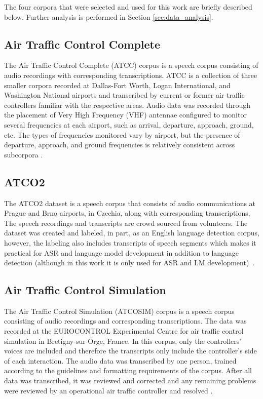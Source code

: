 \documentclass[12pt]{article}
\begin{document}
The four corpora that were selected and used for this work are briefly described below. Further analysis is performed in Section
\ref{sec:data_analysis}.

\subsection{Air Traffic Control Complete}\label{sec:atcc}
The Air Traffic Control Complete (ATCC) corpus is a speech corpus consisting of audio recordings with corresponding transcriptions.
ATCC is a collection of three smaller corpora recorded at Dallas-Fort Worth, Logan International, and Washington National airports and
transcribed by current or former air traffic controllers familiar with the respective areas. Audio data was recorded through the placement of Very
High Frequency (VHF) antennae configured to monitor several frequencies at each airport, such as arrival, departure, approach, ground, etc. The types
of frequencies monitored vary by airport, but the presence of departure, approach, and ground frequencies is relatively consistent across subcorpora
\cite{godfrey_air_1994}.

\subsection{ATCO2}\label{sec:atco2}
The ATCO2 dataset is a speech corpus that consists of audio communications at Prague and Brno airports, in Czechia, along with corresponding
transcriptions. The speech recordings and transcripts are crowd sourced from volunteers. The dataset was created and labeled, in part, as an English
language detection corpus, however, the labeling also includes transcripts of speech segments which makes it practical for ASR and language model
development in addition to language detection (although in this work it is only used for ASR and LM development)~\cite{szoke_detecting_2021}.


\subsection{Air Traffic Control Simulation}\label{sec:atcosim}
The Air Traffic Control Simulation (ATCOSIM) corpus is a speech corpus consisting of audio recordings and corresponding transcriptions.
The data was recorded at the EUROCONTROL Experimental Centre for air traffic control simulation in Bretigny-sur-Orge, France. In this corpus, only the
controllers' voices are included and therefore the transcripts only include the controller's side of each interaction. The audio data was transcribed
by one person, trained according to the guidelines and formatting requirements of the corpus. After all data was transcribed, it was reviewed and
corrected and any remaining problems were reviewed by an operational air traffic controller and resolved \cite{hofbauer_atcosim_2008}.
\end{document}
